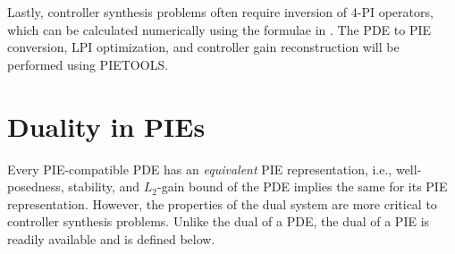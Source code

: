 \documentclass[letterpaper, 10 pt, conference]{ieeeconf}
\newcommand{\mcl}[1]{\mathcal{#1}}
\newcommand{\mbf}[1]{\mathbf{#1}}
\theoremstyle{definition}
\begin{document}

Lastly, controller synthesis problems often require inversion of 4-PI operators, which can be calculated numerically using the formulae in \cite[Sec. VII]{shivakumar_dual_2024}. The PDE to PIE conversion, LPI optimization, and controller gain reconstruction will be performed using PIETOOLS.


\section{Duality in PIEs}

Every PIE-compatible PDE has an \textit{equivalent} PIE representation, i.e., well-posedness, stability, and $L_2$-gain bound of the PDE implies the same for its PIE representation. However, the properties of the dual system are more critical to controller synthesis problems. Unlike the dual of a PDE, the dual of a PIE is readily available and is defined below.
\end{document}
